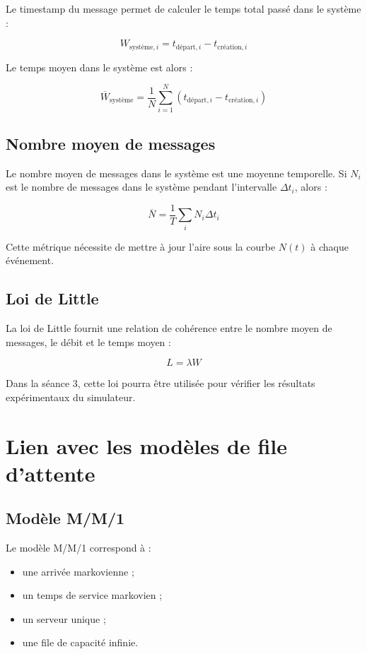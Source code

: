 \documentclass{article}
\begin{document}
Le timestamp du message permet de calculer le temps total passé dans le système :

\[
W_{\text{système},i} =
t_{\text{départ},i} - t_{\text{création},i}
\]

Le temps moyen dans le système est alors :

\[
\overline{W}_{\text{système}} =
\frac{1}{N}
\sum_{i=1}^{N}
\left(
t_{\text{départ},i} - t_{\text{création},i}
\right)
\]

\subsection{Nombre moyen de messages}

Le nombre moyen de messages dans le système est une moyenne temporelle. Si \(N_i\) est le nombre de messages dans le système pendant l’intervalle \(\Delta t_i\), alors :

\[
\overline{N} =
\frac{1}{T}
\sum_i N_i \Delta t_i
\]

Cette métrique nécessite de mettre à jour l’aire sous la courbe \(N(t)\) à chaque événement.

\subsection{Loi de Little}

La loi de Little fournit une relation de cohérence entre le nombre moyen de messages, le débit et le temps moyen :

\[
L = \lambda W
\]

Dans la séance 3, cette loi pourra être utilisée pour vérifier les résultats expérimentaux du simulateur.

\section{Lien avec les modèles de file d’attente}

\subsection{Modèle M/M/1}

Le modèle M/M/1 correspond à :
\begin{itemize}[leftmargin=*]
    \item une arrivée markovienne ;
    \item un temps de service markovien ;
    \item un serveur unique ;
    \item une file de capacité infinie.
\end{itemize}
\end{document}
